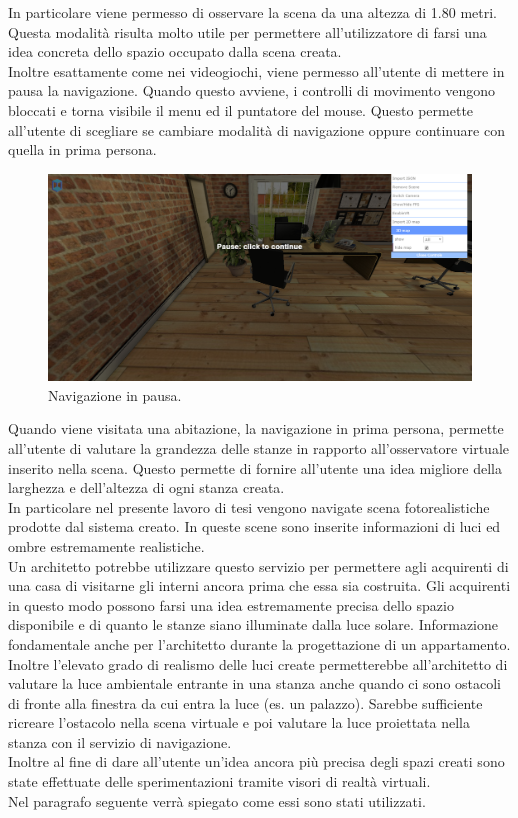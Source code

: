 In particolare viene permesso di osservare la scena da una altezza di 1.80 metri. Questa modalità risulta molto utile per permettere all’utilizzatore di farsi una idea concreta dello spazio occupato dalla scena creata.
\\
Inoltre esattamente come nei videogiochi, viene permesso all’utente di mettere in pausa la navigazione.
Quando questo avviene, i controlli di movimento vengono bloccati e torna visibile il menu ed il puntatore del mouse. Questo permette all’utente di scegliare se cambiare modalità di navigazione  oppure continuare con quella in prima persona.
\begin{figure}[htb]
 \centering
 \includegraphics[width=1\linewidth]{images/chapter_navigazione_scena/navigator_pause.png}\hfill
 \caption[Navigazione in pausa.]{Navigazione in pausa.}
 \label{fig:navigazione_scena_navigator_pause}
\end{figure}
\newpage
Quando viene visitata una abitazione, la navigazione in prima persona, permette all’utente di valutare la grandezza delle stanze in rapporto all’osservatore virtuale inserito nella scena. Questo permette di fornire all’utente una idea migliore della larghezza e dell’altezza di ogni stanza creata.
\\
In particolare nel presente lavoro di tesi vengono navigate scena fotorealistiche prodotte dal sistema creato. In queste scene sono inserite informazioni di luci ed ombre estremamente realistiche.
\\
Un architetto potrebbe utilizzare questo servizio per permettere agli acquirenti di una casa di visitarne gli interni ancora prima che essa sia costruita.
Gli acquirenti in questo modo possono farsi una idea estremamente precisa dello spazio disponibile e di quanto le stanze siano illuminate dalla luce solare.
Informazione fondamentale anche per l’architetto durante la progettazione di un appartamento.
\\
Inoltre l’elevato grado di realismo delle luci create permetterebbe all’architetto di valutare la luce ambientale entrante in una stanza anche quando ci sono ostacoli di fronte alla finestra da cui entra la luce (es. un palazzo). Sarebbe sufficiente ricreare l’ostacolo nella scena virtuale e poi valutare la luce proiettata nella stanza con il servizio di navigazione.
\\
Inoltre al fine di dare all’utente un’idea ancora più precisa degli spazi creati sono state effettuate delle sperimentazioni tramite visori di realtà virtuali.
\\ 
Nel paragrafo seguente verrà spiegato come essi sono stati utilizzati.

